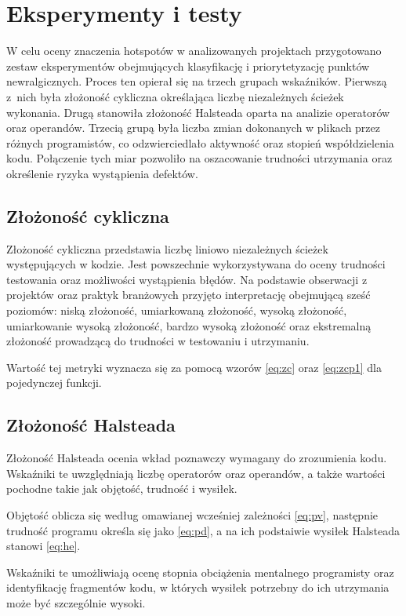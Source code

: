 \section{Eksperymenty i testy}

W celu oceny znaczenia hotspotów w analizowanych projektach przygotowano zestaw eksperymentów obejmujących klasyfikację i priorytetyzację punktów newralgicznych. Proces ten opierał się na trzech grupach wskaźników. Pierwszą z~nich była złożoność cykliczna określająca liczbę niezależnych ścieżek wykonania. Drugą stanowiła złożoność Halsteada oparta na analizie operatorów oraz operandów. Trzecią grupą była liczba zmian dokonanych w plikach przez różnych programistów, co odzwierciedlało aktywność oraz stopień współdzielenia kodu. Połączenie tych miar pozwoliło na oszacowanie trudności utrzymania oraz określenie ryzyka wystąpienia defektów.

\subsection{Złożoność cykliczna}

Złożoność cykliczna przedstawia liczbę liniowo niezależnych ścieżek występujących w kodzie. Jest powszechnie wykorzystywana do oceny trudności testowania oraz możliwości wystąpienia błędów. Na podstawie obserwacji z projektów oraz praktyk branżowych przyjęto interpretację obejmującą sześć poziomów: niską złożoność, umiarkowaną złożoność, wysoką złożoność, umiarkowanie wysoką złożoność, bardzo wysoką złożoność oraz ekstremalną złożoność prowadzącą do trudności w testowaniu i utrzymaniu.

Wartość tej metryki wyznacza się za pomocą wzorów \eqref{eq:zc} oraz \eqref{eq:zcp1} dla pojedynczej funkcji.

\subsection{Złożoność Halsteada}

Złożoność Halsteada ocenia wkład poznawczy wymagany do zrozumienia kodu. Wskaźniki te uwzględniają liczbę operatorów oraz operandów, a także wartości pochodne takie jak objętość, trudność i wysiłek.

Objętość oblicza się według omawianej wcześniej zależności
\eqref{eq:pv}, następnie trudność programu określa się jako \eqref{eq:pd}, a na ich podstaiwie wysiłek Halsteada stanowi \eqref{eq:he}.

Wskaźniki te umożliwiają ocenę stopnia obciążenia  mentalnego programisty oraz identyfikację fragmentów kodu, w których wysiłek potrzebny do ich utrzymania może być szczególnie wysoki.

